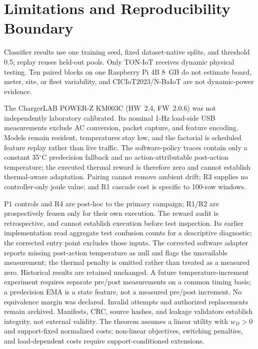 \section{Limitations and Reproducibility Boundary}
\label{sec:limits}
Classifier results use one training seed, fixed dataset-native splits, and threshold 0.5; replay reuses held-out pools. Only TON-IoT receives dynamic physical testing. Ten paired blocks on one Raspberry Pi 4B 8~GB do not estimate board, meter, site, or fleet variability, and CICIoT2023/N-BaIoT are not dynamic-power evidence.

The ChargerLAB POWER-Z KM003C (HW~2.4, FW~2.0.6) was not independently laboratory calibrated. Its nominal 1-Hz load-side USB measurements exclude AC conversion, packet capture, and feature encoding. Models remain resident, temperatures stay low, and the factorial is scheduled feature replay rather than live traffic. The software-policy traces contain only a constant 35$^{\circ}$C predecision fallback and no action-attributable post-action temperature; the executed thermal reward is therefore zero and cannot establish thermal-aware adaptation. Pairing cannot remove ambient drift; R3 supplies no controller-only joule value; and R1 cascade cost is specific to 100-row windows.

P1 controls and R4 are post-hoc to the primary campaign; R1/R2 are prospectively frozen only for their own execution. The reward audit is retrospective, and cannot establish execution before test inspection. Its earlier implementation read aggregate test confusion counts for a descriptive diagnostic; the corrected entry point excludes those inputs. The corrected software adapter reports missing post-action temperature as null and flags the unavailable measurement; the thermal penalty is omitted rather than treated as a measured zero. Historical results are retained unchanged. A future temperature-increment experiment requires separate pre/post measurements on a common timing basis; a predecision EMA is a state feature, not a measured pre/post increment. No equivalence margin was declared. Invalid attempts and authorized replacements remain archived. Manifests, CRC, source hashes, and leakage validators establish integrity, not external validity. The theorem assumes a linear utility with $w_D>0$ and support-fixed normalized costs; non-linear objectives, switching penalties, and load-dependent costs require support-conditioned extensions.
